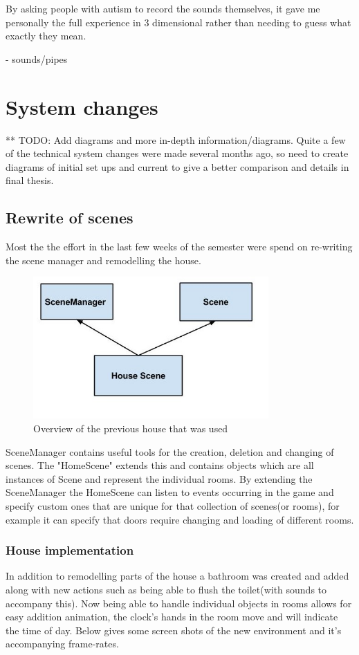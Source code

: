 \documentclass[11pt]{report}
\begin{document}
By asking people with autism to record the sounds themselves, it gave me personally the full experience in 3 dimensional rather than needing to guess what exactly they mean.

- sounds/pipes


\section{System changes}
** TODO: Add diagrams and more in-depth information/diagrams. Quite a few of the technical system changes were made several months ago, so need to create diagrams of initial set ups and current to give a better comparison and details in final thesis.

\subsection{Rewrite of scenes}
Most the the effort in the last few weeks of the semester were spend on re-writing the scene manager and remodelling the house. 

\begin{figure}[H]
\centering
\includegraphics[width=90mm]{images/scenemanager.jpg}
\caption{Overview of the previous house that was used}
\label{old_house}
\end{figure}

SceneManager contains useful tools for the creation, deletion and changing of scenes. The "HomeScene" extends this and contains objects which are all instances of Scene and represent the individual rooms. By extending the SceneManager the HomeScene can listen to events occurring in the game and specify custom ones that are unique for that collection of scenes(or rooms), for example it can specify that doors require changing and loading of different rooms. 

\subsubsection{House implementation}
In addition to remodelling parts of the house a bathroom was created and added along with new actions such as being able to flush the toilet(with sounds to accompany this). Now being able to handle individual objects in rooms allows for easy addition animation, the clock's hands in the room move and will indicate the time of day. Below gives some screen shots of the new environment and it's accompanying frame-rates. 
\end{document}
